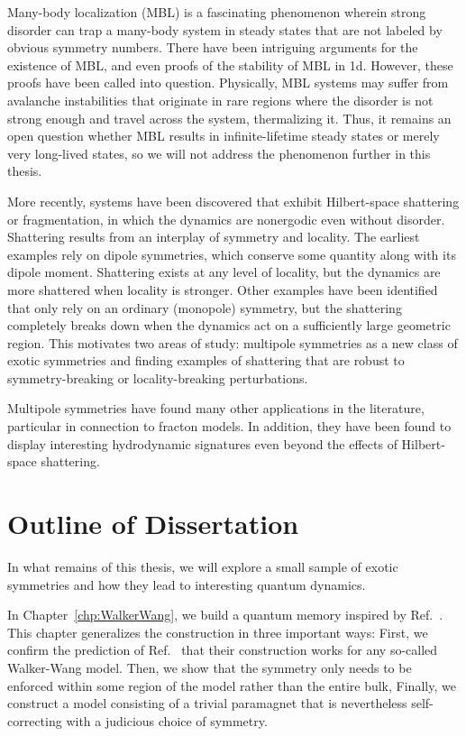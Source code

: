 Many-body localization (MBL) is a fascinating phenomenon wherein strong disorder can trap a many-body system in steady states that are not labeled by obvious symmetry numbers. There have been intriguing arguments for the existence of MBL, and even proofs of the stability of MBL in 1d. However, these proofs have been called into question. Physically, MBL systems may suffer from avalanche instabilities that originate in rare regions where the disorder is not strong enough and travel across the system, thermalizing it. Thus, it remains an open question whether MBL results in infinite-lifetime steady states or merely very long-lived states, so we will not address the phenomenon further in this thesis. 

More recently, systems have been discovered that exhibit Hilbert-space shattering or fragmentation, in which the dynamics are nonergodic even without disorder. Shattering results from an interplay of symmetry and locality. The earliest examples rely on dipole symmetries, which conserve some quantity along with its dipole moment. Shattering exists at any level of locality, but the dynamics are more shattered when locality is stronger. Other examples have been identified that only rely on an ordinary (monopole) symmetry, but the shattering completely breaks down when the dynamics act on a sufficiently large geometric region. This motivates two areas of study: multipole symmetries as a new class of exotic symmetries and finding examples of shattering that are robust to symmetry-breaking or locality-breaking perturbations.

Multipole symmetries have found many other applications in the literature, particular in connection to fracton models. In addition, they have been found to display interesting hydrodynamic signatures even beyond the effects of Hilbert-space shattering.

\section{Outline of Dissertation}

In what remains of this thesis, we will explore a small sample of exotic symmetries and how they lead to interesting quantum dynamics.

In Chapter~\ref{chp:WalkerWang}, we build a quantum memory inspired by Ref.~\cite{RobertsBartlett2020}. This chapter generalizes the  construction in three important ways: First, we confirm the prediction of Ref.~\cite{RobertsBartlett2020} that their construction works for any so-called Walker-Wang model. Then, we show that the symmetry only needs to be enforced within some region of the model rather than the entire bulk, Finally, we construct a model consisting of a trivial paramagnet that is nevertheless self-correcting with a judicious choice of symmetry.

